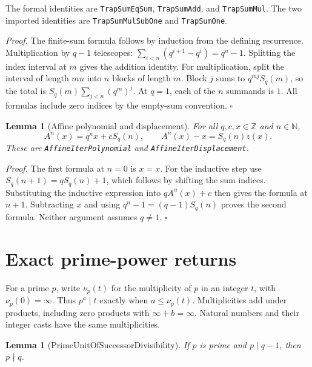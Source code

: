 \documentclass[11pt,letterpaper]{article}
\newcommand{\N}{\mathbb{N}}
\newcommand{\Z}{\mathbb{Z}}
\newtheorem{lemma}[theorem]{Lemma}
\newenvironment{proof}{\noindent\textit{Proof.}}{\hfill\(\square\)}
\begin{document}
The formal identities are \texttt{Trap\allowbreak Sum\allowbreak Eq\allowbreak Sum}, \texttt{Trap\allowbreak Sum\allowbreak Add},
and \texttt{Trap\allowbreak Sum\allowbreak Mul}. The two imported identities are
\texttt{Trap\allowbreak Sum\allowbreak Mul\allowbreak Sub\allowbreak One} and \texttt{Trap\allowbreak Sum\allowbreak One}.

\begin{proof}
The finite-sum formula follows by induction from the defining recurrence.
Multiplication by \(q-1\) telescopes:
\(\sum_{i<n}(q^{i+1}-q^i)=q^n-1\).
Splitting the index interval at \(m\) gives the addition identity.
For multiplication, split the interval of length \(mn\) into \(n\)
blocks of length \(m\). Block \(j\) sums to \(q^{mj}S_q(m)\),
so the total is \(S_q(m)\sum_{j<n}(q^m)^j\).
At \(q=1\), each of the \(n\) summands is \(1\).
All formulas include zero indices by the empty-sum convention.
\end{proof}

\begin{lemma}[Affine polynomial and displacement]
For all \(q,c,x\in\Z\) and \(n\in\N\),
\[
 A^n(x)=q^nx+cS_q(n),\qquad
 A^n(x)-x=S_q(n)z(x).
\]
These are \texttt{Affine\allowbreak Iter\allowbreak Polynomial} and
\texttt{Affine\allowbreak Iter\allowbreak Displacement}.
\end{lemma}

\begin{proof}
The first formula at \(n=0\) is \(x=x\).
For the inductive step use \(S_q(n+1)=qS_q(n)+1\), which follows
by shifting the sum indices. Substituting the inductive expression
into \(qA^n(x)+c\) then gives the formula at \(n+1\).
Subtracting \(x\) and using \(q^n-1=(q-1)S_q(n)\) proves
 the second formula. Neither argument assumes \(q\ne1\).
\end{proof}

\section{Exact prime-power returns}

For a prime \(p\), write \(\nu_p(t)\) for the multiplicity of \(p\)
in an integer \(t\), with \(\nu_p(0)=\infty\).
Thus \(p^a\mid t\) exactly when \(a\le\nu_p(t)\).
Multiplicities add under products, including zero products with
\(\infty+b=\infty\). Natural numbers and their integer casts have
the same multiplicities.

\begin{lemma}[PrimeUnitOfSuccessorDivisibility]
If \(p\) is prime and \(p\mid q-1\), then \(p\nmid q\).
\end{lemma}
\end{document}
